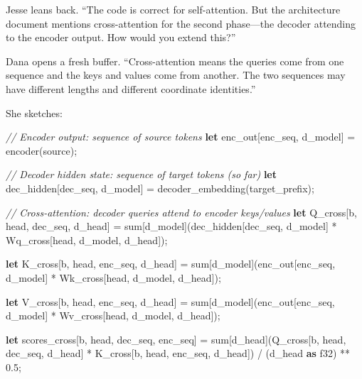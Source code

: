 \documentclass[11pt,]{article}
\newenvironment{Shaded}{}{}
\newcommand{\CommentTok}[1]{\textcolor[rgb]{0.38,0.63,0.69}{\textit{#1}}}
\newcommand{\DataTypeTok}[1]{\textcolor[rgb]{0.56,0.13,0.00}{#1}}
\newcommand{\DecValTok}[1]{\textcolor[rgb]{0.25,0.63,0.44}{#1}}
\newcommand{\KeywordTok}[1]{\textcolor[rgb]{0.00,0.44,0.13}{\textbf{#1}}}
\newcommand{\NormalTok}[1]{#1}
\newcommand{\OperatorTok}[1]{\textcolor[rgb]{0.40,0.40,0.40}{#1}}
\begin{document}
Jesse leans back. ``The code is correct for self-attention. But the
architecture document mentions cross-attention for the second
phase---the decoder attending to the encoder output. How would you
extend this?''

Dana opens a fresh buffer. ``Cross-attention means the queries come from
one sequence and the keys and values come from another. The two
sequences may have different lengths and different coordinate
identities.''

She sketches:

\begin{Shaded}
\begin{Highlighting}[]
\CommentTok{// Encoder output: sequence of source tokens}
\KeywordTok{let}\NormalTok{ enc_out}\OperatorTok{[}\NormalTok{enc_seq, d_model}\OperatorTok{]}\NormalTok{ = encoder(source);}

\CommentTok{// Decoder hidden state: sequence of target tokens (so far)}
\KeywordTok{let}\NormalTok{ dec_hidden}\OperatorTok{[}\NormalTok{dec_seq, d_model}\OperatorTok{]}\NormalTok{ = decoder_embedding(target_prefix);}

\CommentTok{// Cross-attention: decoder queries attend to encoder keys/values}
\KeywordTok{let}\NormalTok{ Q_cross}\OperatorTok{[}\NormalTok{b, head, dec_seq, d_head}\OperatorTok{]}\NormalTok{ =}
\NormalTok{    sum}\OperatorTok{[}\NormalTok{d_model}\OperatorTok{]}\NormalTok{(dec_hidden}\OperatorTok{[}\NormalTok{dec_seq, d_model}\OperatorTok{]}\NormalTok{ *}
\NormalTok{                  Wq_cross}\OperatorTok{[}\NormalTok{head, d_model, d_head}\OperatorTok{]}\NormalTok{);}

\KeywordTok{let}\NormalTok{ K_cross}\OperatorTok{[}\NormalTok{b, head, enc_seq, d_head}\OperatorTok{]}\NormalTok{ =}
\NormalTok{    sum}\OperatorTok{[}\NormalTok{d_model}\OperatorTok{]}\NormalTok{(enc_out}\OperatorTok{[}\NormalTok{enc_seq, d_model}\OperatorTok{]}\NormalTok{ *}
\NormalTok{                  Wk_cross}\OperatorTok{[}\NormalTok{head, d_model, d_head}\OperatorTok{]}\NormalTok{);}

\KeywordTok{let}\NormalTok{ V_cross}\OperatorTok{[}\NormalTok{b, head, enc_seq, d_head}\OperatorTok{]}\NormalTok{ =}
\NormalTok{    sum}\OperatorTok{[}\NormalTok{d_model}\OperatorTok{]}\NormalTok{(enc_out}\OperatorTok{[}\NormalTok{enc_seq, d_model}\OperatorTok{]}\NormalTok{ *}
\NormalTok{                  Wv_cross}\OperatorTok{[}\NormalTok{head, d_model, d_head}\OperatorTok{]}\NormalTok{);}

\KeywordTok{let}\NormalTok{ scores_cross}\OperatorTok{[}\NormalTok{b, head, dec_seq, enc_seq}\OperatorTok{]}\NormalTok{ =}
\NormalTok{    sum}\OperatorTok{[}\NormalTok{d_head}\OperatorTok{]}\NormalTok{(Q_cross}\OperatorTok{[}\NormalTok{b, head, dec_seq, d_head}\OperatorTok{]}\NormalTok{ *}
\NormalTok{                 K_cross}\OperatorTok{[}\NormalTok{b, head, enc_seq, d_head}\OperatorTok{]}\NormalTok{)}
\NormalTok{    / (d_head }\KeywordTok{as} \DataTypeTok{f32}\NormalTok{) ** }\DecValTok{0.5}\NormalTok{;}


\end{Highlighting}
\end{Shaded}
\end{document}
